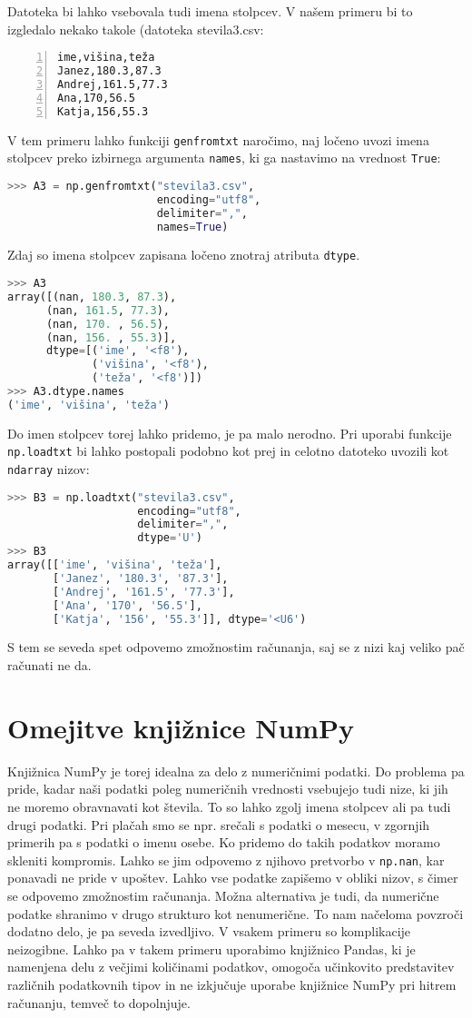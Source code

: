 Datoteka bi lahko vsebovala tudi imena stolpcev. V našem primeru bi to izgledalo nekako takole (datoteka {stevila3.csv}:
\begin{lstlisting}[numbers=left]
ime,višina,teža
Janez,180.3,87.3
Andrej,161.5,77.3
Ana,170,56.5
Katja,156,55.3
\end{lstlisting} 
V tem primeru lahko funkciji \texttt{genfromtxt} naročimo, naj ločeno uvozi imena stolpcev preko izbirnega argumenta \texttt{names}, ki ga nastavimo na vrednost \texttt{True}:
\begin{lstlisting}[language=Python]
>>> A3 = np.genfromtxt("stevila3.csv",
                       encoding="utf8",
                       delimiter=",", 
                       names=True)
\end{lstlisting}
Zdaj so imena stolpcev zapisana ločeno znotraj atributa \texttt{dtype}.
\begin{lstlisting}[language=Python]
>>> A3
array([(nan, 180.3, 87.3), 
      (nan, 161.5, 77.3), 
      (nan, 170. , 56.5),
      (nan, 156. , 55.3)],
      dtype=[('ime', '<f8'), 
             ('višina', '<f8'), 
             ('teža', '<f8')])
>>> A3.dtype.names
('ime', 'višina', 'teža')
\end{lstlisting}
Do imen stolpcev torej lahko pridemo, je pa malo nerodno. Pri uporabi funkcije \texttt{np.loadtxt} bi lahko postopali podobno kot prej in celotno datoteko uvozili kot \texttt{ndarray} nizov:
\begin{lstlisting}[language=Python]
>>> B3 = np.loadtxt("stevila3.csv", 
                    encoding="utf8", 
                    delimiter=",", 
                    dtype='U')
>>> B3
array([['ime', 'višina', 'teža'],
       ['Janez', '180.3', '87.3'],
       ['Andrej', '161.5', '77.3'],
       ['Ana', '170', '56.5'],
       ['Katja', '156', '55.3']], dtype='<U6')
\end{lstlisting}
S tem se seveda spet odpovemo zmožnostim računanja, saj se z nizi kaj veliko pač računati ne da. 

\section{Omejitve knjižnice NumPy}

Knjižnica NumPy je torej idealna za delo z numeričnimi podatki. Do problema pa pride, kadar naši podatki poleg numeričnih vrednosti vsebujejo tudi nize, ki jih ne moremo obravnavati kot števila. To so lahko zgolj imena stolpcev ali pa tudi drugi podatki. Pri plačah smo se npr. srečali s podatki o mesecu, v zgornjih primerih pa s podatki o imenu osebe. Ko pridemo do takih podatkov moramo skleniti kompromis. Lahko se jim odpovemo z njihovo pretvorbo v \texttt{np.nan}, kar ponavadi ne pride v upoštev. Lahko vse podatke zapišemo v obliki nizov, s čimer se odpovemo zmožnostim računanja. Možna alternativa je tudi, da numerične podatke shranimo v drugo strukturo kot nenumerične. To nam načeloma povzroči dodatno delo, je pa seveda izvedljivo. V vsakem primeru so komplikacije neizogibne. Lahko pa v takem primeru uporabimo knjižnico Pandas, ki je namenjena delu z večjimi količinami podatkov, omogoča učinkovito predstavitev različnih podatkovnih tipov in ne izkjučuje uporabe knjižnice NumPy pri hitrem računanju, temveč to dopolnjuje.
